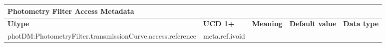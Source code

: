 \documentclass[11pt,a4paper]{ivoa}
\begin{document}
\begin{appendices}
\begin{table}[H]
\begin{adjustbox}{angle=90}
\begin{tabular}{p{7in}p{0.87in}p{0.91in}p{0.4in}p{0.25in}}
\end{tabular}
\end{adjustbox}
 \end{table}





\newpage



\begin{table}[H]
\centering
\begin{adjustbox}{angle=90}
\begin{tabular}{p{7in}p{0.87in}p{0.91in}p{0.4in}p{0.25in}}
\multicolumn{5}{p{\dimexpr6.59in+8\tabcolsep\relax}}{\centering 
{\fontsize{10pt}{12.0pt}\selectfont \textbf{Photometry Filter Access Metadata}}} \\
\hline
\multicolumn{1}{p{5in}}{{\fontsize{8pt}{8pt}\selectfont \textbf{Utype}}} &
\multicolumn{1}{p{0.87in}}{{\fontsize{8pt}{8pt}\selectfont \textbf{UCD 1+}}} &
\multicolumn{1}{p{0.91in}}{{\fontsize{8pt}{8pt}\selectfont \textbf{Meaning}}} &
\multicolumn{1}{p{0.74in}}{{\fontsize{8pt}{8pt}\selectfont \textbf{Default value}}} &
\multicolumn{1}{p{0.35in}}{{\fontsize{8pt}{8pt}\selectfont \textbf{Data type}}} \\
\hline
\multicolumn{1}{p{5in}}{{\fontsize{8pt}{8pt}
\selectfont photDM:PhotometryFilter.transmissionCurve.access.reference}} &
\multicolumn{1}{p{0.87in}}{{\fontsize{8pt}{8pt}\selectfont meta.ref.ivoid }} &


\end{tabular}
\end{adjustbox}
\end{table}
\end{appendices}
\end{document}

